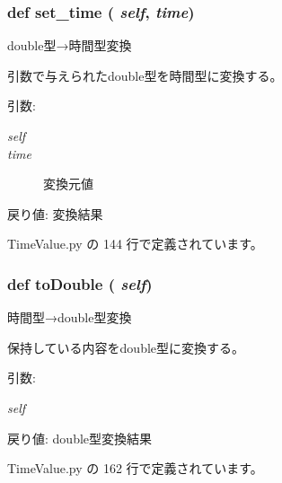 \subsubsection{\setlength{\rightskip}{0pt plus 5cm}def set\_\-time ( {\em self},  {\em time})}\label{classsource__py_1_1_time_value_1_1_time_value_82d4f30a5a028b5f6d8a28e017a442ff}


double型→時間型変換 

引数で与えられたdouble型を時間型に変換する。

\begin{Desc}
\item[引数:]
\begin{description}
\item[{\em self}]\item[{\em time}]変換元値\end{description}
\end{Desc}
\begin{Desc}
\item[戻り値:]変換結果 \end{Desc}


 TimeValue.py の 144 行で定義されています。
\subsubsection{\setlength{\rightskip}{0pt plus 5cm}def toDouble ( {\em self})}\label{classsource__py_1_1_time_value_1_1_time_value_4333b58211ebc55ff0caf35944599871}


時間型→double型変換 

保持している内容をdouble型に変換する。

\begin{Desc}
\item[引数:]
\begin{description}
\item[{\em self}]\end{description}
\end{Desc}
\begin{Desc}
\item[戻り値:]double型変換結果 \end{Desc}


 TimeValue.py の 162 行で定義されています。
